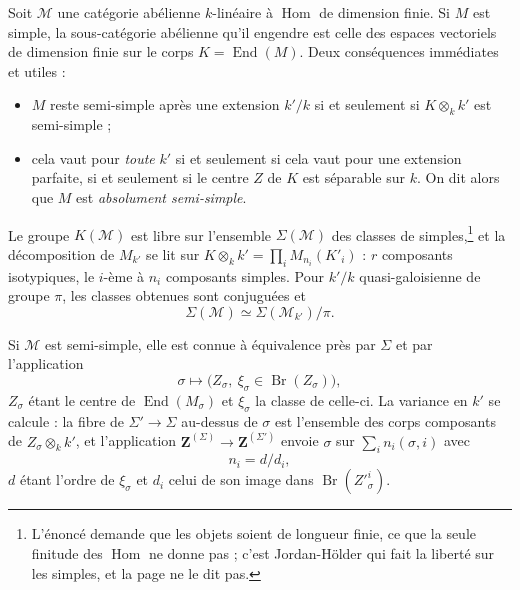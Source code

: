 \documentclass[11pt,a4paper]{article}
\begin{document}
Soit $\mathcal{M}$ une catégorie abélienne $k$-linéaire à
$\operatorname{Hom}$ de dimension finie. Si $M$ est simple, la
sous-catégorie abélienne qu'il engendre est celle des espaces vectoriels de
dimension finie sur le corps $K = \operatorname{End}(M)$. Deux conséquences
immédiates et utiles :
\begin{itemize}
\item $M$ reste semi-simple après une extension $k'/k$ si et seulement si
$K \otimes_{k} k'$ est semi-simple ;
\item cela vaut pour \emph{toute} $k'$ si et seulement si cela vaut pour une
extension parfaite, si et seulement si le centre $Z$ de $K$ est séparable sur
$k$. On dit alors que $M$ est \emph{absolument semi-simple}.
\end{itemize}
Le groupe $K(\mathcal{M})$ est libre sur l'ensemble $\Sigma(\mathcal{M})$ des
classes de simples,\footnote{L'énoncé demande que les objets soient de longueur
finie, ce que la seule finitude des $\operatorname{Hom}$ ne donne pas ; c'est
Jordan-Hölder qui fait la liberté sur les simples, et la page ne le dit pas.}
et la décomposition de $M_{k'}$ se lit sur $K \otimes_{k} k' = \prod_{i}
M_{n_{i}}(K'_{i})$ : $r$ composants isotypiques, le $i$-ème à $n_{i}$
composants simples. Pour $k'/k$ quasi-galoisienne de groupe $\pi$, les classes
obtenues sont conjuguées et
\[
\Sigma(\mathcal{M}) \simeq \Sigma(\mathcal{M}_{k'})/\pi .
\]

Si $\mathcal{M}$ est semi-simple, elle est connue à équivalence près par
$\Sigma$ et par l'application
\[
\sigma \longmapsto \bigl( Z_{\sigma},\ \xi_{\sigma} \in
\operatorname{Br}(Z_{\sigma}) \bigr) ,
\]
$Z_{\sigma}$ étant le centre de $\operatorname{End}(M_{\sigma})$ et
$\xi_{\sigma}$ la classe de celle-ci. La variance en $k'$ se calcule : la fibre
de $\Sigma' \to \Sigma$ au-dessus de $\sigma$ est l'ensemble des corps
composants de $Z_{\sigma} \otimes_{k} k'$, et l'application
$\mathbf{Z}^{(\Sigma)} \to \mathbf{Z}^{(\Sigma')}$ envoie $\sigma$ sur
$\sum_{i} n_{i}(\sigma, i)$ avec
\[
n_{i} = d/d_{i} ,
\]
$d$ étant l'ordre de $\xi_{\sigma}$ et $d_{i}$ celui de son image dans
$\operatorname{Br}(Z'^{i}_{\sigma})$.
\end{document}
